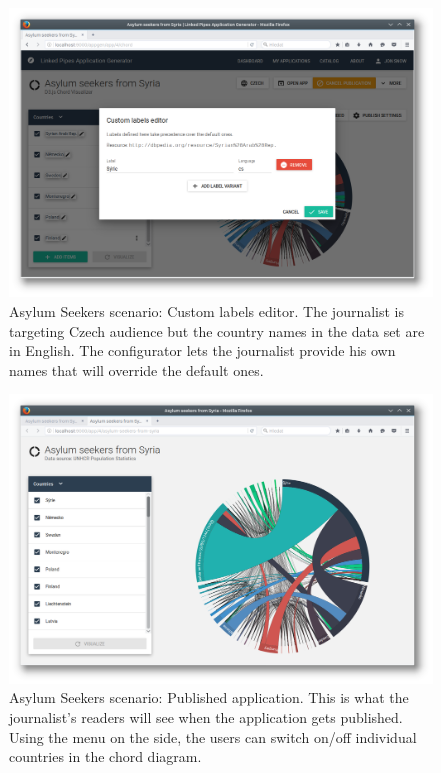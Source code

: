 \begin{figure}
	\centering
	\includegraphics[width=145mm]{img/05_scenario_08_custom_label_editor}
	\caption{Asylum Seekers scenario: Custom labels editor. The journalist is targeting Czech audience but the country names in the data set are in English. The configurator lets the journalist provide his own names that will override the default ones. }
	\label{fig:scenario-08-custom-label-editor}
\end{figure}
\begin{figure}
	\centering
	\includegraphics[width=145mm]{img/05_scenario_09_published_app}
	\caption{Asylum Seekers scenario: Published application. This is what the journalist's readers will see when the application gets published. Using the menu on the side, the users can switch on/off individual countries in the chord diagram.}
    \label{fig:scenario-09-published-app}
\end{figure}
